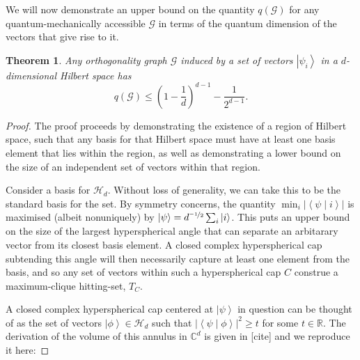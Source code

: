\documentclass{amsart}
\newtheorem{thm}{Theorem}
\theoremstyle{definition}
\newcommand{\ket}[1]{{\left\vert{#1}\right\rangle}}
\newcommand{\braket}[2]{{\left< {#1} \middle\vert {#2}\right>}}
\newcommand{\sprod}[2]{\left|\left< {#1} \middle| {#2} \right>\right|}
\begin{document}
We will now demonstrate an upper bound on the quantity $q(\mathcal{G})$ for any quantum-mechanically accessible $\mathcal{G}$ in terms of the quantum dimension of the vectors that give rise to it.
\begin{thm}
Any orthogonality graph $\mathcal{G}$ induced by a set of vectors $\ket{\psi_i}$ in a $d$-dimensional Hilbert space has
\begin{equation}
q(\mathcal{G}) \leq \left(1-\frac1d\right)^{d-1}-\frac{1}{2^{d-1}}.
\end{equation}
\end{thm}
\begin{proof}
The proof proceeds by demonstrating the existence of a region of Hilbert space, such that any basis for that Hilbert space must have at least one basis element that lies within the region, as well as demonstrating a lower
bound on the size of an independent set of vectors within that region.

Consider a basis for $\mathcal{H}_d$. Without loss of generality, we can take this to be the standard basis for the set. By symmetry concerns, the quantity $\min_i \left|\braket{\psi}{i}\right|$ is maximised (albeit nonuniquely) by $\ket{\psi}=d^{\nicefrac{-1}{2}}\sum_i\ket{i}$. This puts an upper bound on the size of the largest hyperspherical angle that can separate an arbitarary vector from its closest basis element. A closed complex hyperspherical cap subtending this angle will then necessarily capture at least one element from the basis, and so any set of vectors within such a hyperspherical cap $C$ construe a maximum-clique hitting-set, $T_C$.

A closed complex hyperspherical cap centered at $\ket{\psi}$ in question can be thought of as the set of vectors $\ket{\phi}\in\mathcal{H}_d$ such that $\sprod{\psi}{\phi}^2\geq t$ for some $t\in\mathbb{R}$. The derivation of the volume of this annulus in $\mathbb{C}^d$ is given in [cite] and we reproduce it here:


\end{proof}
\end{document}
